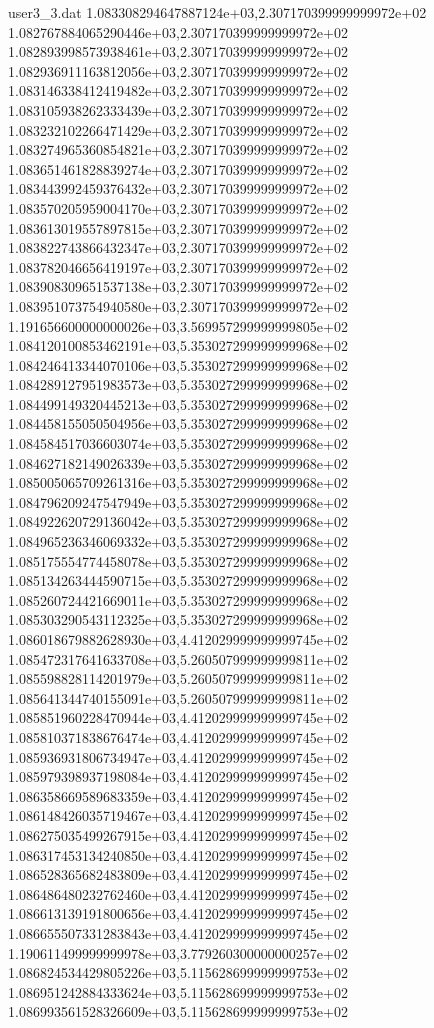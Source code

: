 \begin{filecontents}{user3_3.dat}
1.083308294647887124e+03,2.307170399999999972e+02
1.082767884065290446e+03,2.307170399999999972e+02
1.082893998573938461e+03,2.307170399999999972e+02
1.082936911163812056e+03,2.307170399999999972e+02
1.083146338412419482e+03,2.307170399999999972e+02
1.083105938262333439e+03,2.307170399999999972e+02
1.083232102266471429e+03,2.307170399999999972e+02
1.083274965360854821e+03,2.307170399999999972e+02
1.083651461828839274e+03,2.307170399999999972e+02
1.083443992459376432e+03,2.307170399999999972e+02
1.083570205959004170e+03,2.307170399999999972e+02
1.083613019557897815e+03,2.307170399999999972e+02
1.083822743866432347e+03,2.307170399999999972e+02
1.083782046656419197e+03,2.307170399999999972e+02
1.083908309651537138e+03,2.307170399999999972e+02
1.083951073754940580e+03,2.307170399999999972e+02
1.191656600000000026e+03,3.569957299999999805e+02
1.084120100853462191e+03,5.353027299999999968e+02
1.084246413344070106e+03,5.353027299999999968e+02
1.084289127951983573e+03,5.353027299999999968e+02
1.084499149320445213e+03,5.353027299999999968e+02
1.084458155050504956e+03,5.353027299999999968e+02
1.084584517036603074e+03,5.353027299999999968e+02
1.084627182149026339e+03,5.353027299999999968e+02
1.085005065709261316e+03,5.353027299999999968e+02
1.084796209247547949e+03,5.353027299999999968e+02
1.084922620729136042e+03,5.353027299999999968e+02
1.084965236346069332e+03,5.353027299999999968e+02
1.085175554774458078e+03,5.353027299999999968e+02
1.085134263444590715e+03,5.353027299999999968e+02
1.085260724421669011e+03,5.353027299999999968e+02
1.085303290543112325e+03,5.353027299999999968e+02
1.086018679882628930e+03,4.412029999999999745e+02
1.085472317641633708e+03,5.260507999999999811e+02
1.085598828114201979e+03,5.260507999999999811e+02
1.085641344740155091e+03,5.260507999999999811e+02
1.085851960228470944e+03,4.412029999999999745e+02
1.085810371838676474e+03,4.412029999999999745e+02
1.085936931806734947e+03,4.412029999999999745e+02
1.085979398937198084e+03,4.412029999999999745e+02
1.086358669589683359e+03,4.412029999999999745e+02
1.086148426035719467e+03,4.412029999999999745e+02
1.086275035499267915e+03,4.412029999999999745e+02
1.086317453134240850e+03,4.412029999999999745e+02
1.086528365682483809e+03,4.412029999999999745e+02
1.086486480232762460e+03,4.412029999999999745e+02
1.086613139191800656e+03,4.412029999999999745e+02
1.086655507331283843e+03,4.412029999999999745e+02
1.190611499999999978e+03,3.779260300000000257e+02
1.086824534429805226e+03,5.115628699999999753e+02
1.086951242884333624e+03,5.115628699999999753e+02
1.086993561528326609e+03,5.115628699999999753e+02

\end{filecontents}
